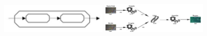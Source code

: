 \begin{center}
    \includegraphics[width=0.4\textwidth]{./pipe-filter}
    \includegraphics[width=0.4\textwidth]{./pipe-filter2}
\end{center}
